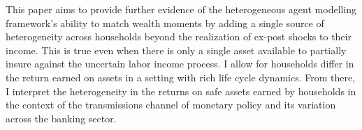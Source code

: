 \par This paper aims to provide further evidence of the heterogeneous agent modelling framework's ability to match wealth moments by adding a single source of heterogeneity across households beyond the realization of ex-post shocks to their income. This is true even when there is only a single asset available to partially insure against the uncertain labor income process. I allow for households differ in the return earned on assets in a setting with rich life cycle dynamics. From there, I interpret the heterogeneity in the returns on safe assets earned by households in the context of the transmissions channel of monetary policy and its variation across the banking sector. 